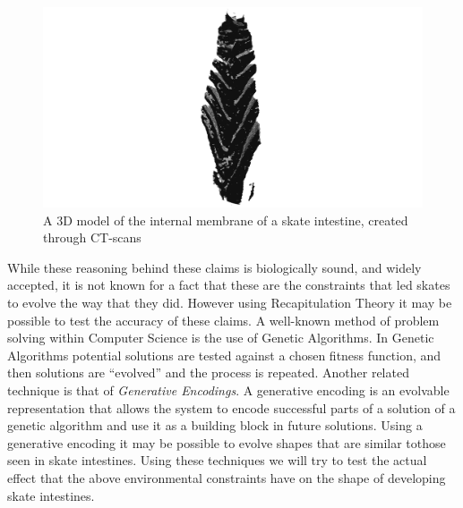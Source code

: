 \documentclass[condensed]{union-cs-thesis}
\begin{document}
\begin{figure}[h]
  \centering
  \includegraphics[scale=0.25]{model_img}
  \caption{A 3D model of the internal membrane of a skate intestine, created through CT-scans}
  \label{fig:gut_model}
\end{figure}

\par
While these reasoning behind these claims is biologically sound, and widely accepted, it is not known for
a fact that these are the constraints that led skates to evolve the way that they did.  However using
Recapitulation Theory it may be possible to test the accuracy of these claims.  A well-known method of
problem solving within Computer Science is the use of Genetic Algorithms.  In Genetic Algorithms potential
solutions are tested against a chosen fitness function, and then solutions are ``evolved'' and the process
is repeated.  Another related technique is that of \emph{Generative Encodings}.  A generative encoding is an
evolvable representation that allows the system to encode successful parts of a solution of a genetic algorithm
and use it as a building block in future solutions.  Using a generative encoding it may be possible to
evolve shapes that are similar tothose seen in skate intestines.  Using these techniques we will try to test
the actual effect that the above environmental constraints have on the shape of developing skate intestines.

\end{document}
